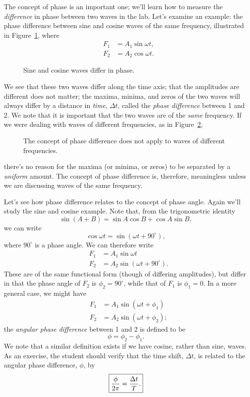 The concept of phase is an important one; we'll learn how to measure the 
{\it difference} in phase between two waves in the lab. Let's examine an 
example: the phase difference between sine and cosine waves of the same 
frequency, 
illustrated in Figure~\ref{fig:scope:phasediffer}, where
\begin{eqnarray*}
& F_1 & =A_1\sin\omega t,  \nonumber \\
& F_2 & = A_2 \cos\omega t.
\end{eqnarray*}
\begin{figure}[htb]
\centerline{\epsfxsize=8cm }
\caption{Sine and cosine waves differ in phase.}
\label{fig:scope:phasediffer}
\end{figure}
We see that these two waves differ along the time axis; that the amplitudes
are different does not matter; the maxima, minima, and zeros of the two waves
will always differ by a distance in {\it time}, $\Delta t$, called the 
{\it phase difference} between 1 and 2.  We note that it is important that the 
two waves are of the {\it same} frequency. If we were dealing with waves of 
different frequencies, as in Figure~\ref{fig:scope:differfreq},
\begin{figure}[htb]
\centerline{\epsfxsize=8cm }
\caption{The concept of phase difference does not apply to waves of different
frequencies.}
\label{fig:scope:differfreq}
\end{figure}
there's no reason for the maxima (or minima, or zeros) to be separated by a 
{\it uniform} amount.  The concept of phase difference is, therefore, 
meaningless unless we are discussing waves of the same frequency.

Let's see how phase difference relates to the concept of phase angle. Again 
we'll study the sine and cosine example. Note that, from the trigonometric
identity
$$ \sin(A+B) = \sin A \cos B + \cos A \sin B, $$
we can write
$$ \cos\omega t = \sin (\omega t +90^\circ), $$
where $90^\circ$ is a phase angle.  We can therefore write
\begin{eqnarray*}
& F_1 & = A_1 \sin \omega t \nonumber \\
& F_2 & = A_2 \sin(\omega t+90^\circ).
\end{eqnarray*}
These are of the same functional form (though of differing amplitudes), but 
differ in that the phase angle of $F_2$ is $\phi_2=90^\circ$, while that of 
$F_1$ is $\phi_1=0$.  In a more general case, we might have
\begin{eqnarray*}
& F_1 & = A_1 \sin (\omega t+\phi_1) \nonumber \\
& F_2 & = A_2 \sin (\omega t + \phi_2);
\end{eqnarray*}
the {\it angular phase difference} between 1 and 2 is defined to be
$$ \phi=\phi_2-\phi_1.$$  
We note that a similar definition exists if we have cosine, rather than sine, 
waves. As an exercise, the student should verify that the time shift, 
$\Delta t$, is related to the angular phase difference, $\phi$, by
\begin{equation}
\fbox{$ \displaystyle \frac{\phi}{2\pi} = \frac{\Delta t}{T}.$} \label{eq:scope:angphase}
\end{equation}

